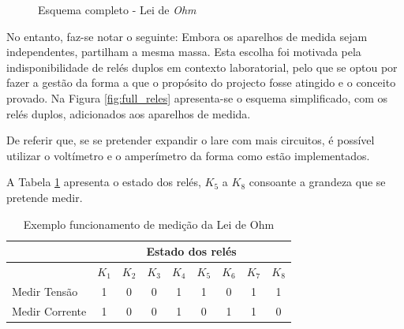 \begin{figure}[hbtp]
	\centering%
		\centering
		\qquad
		\caption{Esquema completo - Lei de \textit{Ohm}}%
		\label{fig:}%
	\end{figure}

No entanto, faz-se notar o seguinte: Embora os aparelhos de medida sejam independentes, partilham a mesma massa. Esta escolha foi motivada pela indisponibilidade de relés duplos em contexto laboratorial, pelo que se optou por fazer a gestão da forma a que o propósito do projecto fosse atingido e o conceito provado. Na Figura \ref{fig:full_reles} apresenta-se o esquema simplificado, com os relés duplos, adicionados aos aparelhos de medida. 

De referir que, se se pretender expandir o \acrshort{lare} com mais circuitos, é possível utilizar o voltímetro e o amperímetro da forma como estão implementados. 

A Tabela \ref{Table:exemplomedicaoohm} apresenta o estado dos relés, $K_{5}$ a $K_{8}$ consoante a grandeza que se pretende medir.

\begin{table}[htb]
	\centering
	\caption{Exemplo funcionamento de medição da Lei de Ohm} 
	
	\label{Table:exemplomedicaoohm}
	\begin{tabular}{lcccccccc}
		\toprule
		               & \multicolumn{8}{c}{Estado dos relés}                                                                       \\
		\midrule
		               & $K_{1}$                              & $K_{2}$ & $K_{3}$ & $K_{4}$ & $K_{5}$ & $K_{6}$ & $K_{7}$ & $K_{8}$ \\
		\midrule
		Medir Tensão   & 1                                    & 0       & 0       & 1       & 1       & 0       & 1       & 1       \\
		\midrule
		Medir Corrente & 1                                    & 0       & 0       & 1       & 0       & 1       & 1       & 0       \\
		\bottomrule
	\end{tabular}
\end{table}

